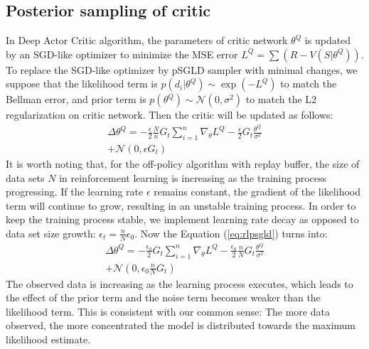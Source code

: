 \subsection{Posterior sampling of critic}
\label{sec:samplecritic}
In Deep Actor Critic algorithm, the parameters of critic network $\theta^Q$ is updated by an SGD-like optimizer to minimize the MSE error $L^Q=\sum(R-V(S|\theta^Q))$. To replace the SGD-like optimizer by pSGLD sampler with minimal changes, we suppose that the likelihood term is $p(d_i|\theta^Q)\sim\exp(-L^Q)$ to match the Bellman error, and prior term is $p(\theta^Q)\sim \mathcal{N}(0,\sigma^2)$ to match the L2 regularization on critic network. Then the critic will be updated as follows:
\begin{equation}
   \label{eq:rlpsgld} 
   \begin{aligned}
      \Delta\theta^Q =-\frac{\epsilon}{2}\frac{N}{n}G_t\sum_{i=1}^{n}\nabla_\theta L^Q -\frac{\epsilon}{2}G_t \frac{\theta^Q}{\sigma^2}\\
      +\mathcal{N}(0,\epsilon G_t)
   \end{aligned}
\end{equation}
It is worth noting that, for the off-policy algorithm with replay buffer, the size of data sets $N$ in reinforcement learning is increasing as the training process progressing. If the learning rate $\epsilon$ remains constant, the gradient of the likelihood term will continue to grow, resulting in an unstable training process. In order to keep the training process stable, we implement learning rate decay as opposed to data set size growth: $\epsilon_t=\frac{n}{N}\epsilon_0$. Now the Equation (\ref{eq:rlpsgld}) turns into:
\begin{equation}
   \label{eq:rlpsgld1} 
   \begin{aligned}
      \Delta\theta^Q =-\frac{\epsilon_0}{2}G_t\sum_{i=1}^{n}\nabla_\theta L^Q -\frac{\epsilon_0}{2}\frac{n}{N}G_t \frac{\theta^Q}{\sigma^2}\\
      +\mathcal{N}(0,\epsilon_0\frac{n}{N} G_t)
   \end{aligned}
\end{equation}
The observed data is increasing as the learning process executes, which leads to the effect of the prior term and the noise term becomes weaker than the likelihood term. This is consistent with our common sense: The more data observed, the more concentrated the model is distributed towards the maximum likelihood estimate.
